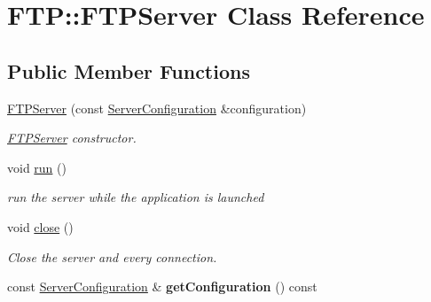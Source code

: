 \hypertarget{class_f_t_p_1_1_f_t_p_server}{\section{F\-T\-P\-:\-:F\-T\-P\-Server Class Reference}
\label{class_f_t_p_1_1_f_t_p_server}
}
\subsection*{Public Member Functions}
\begin{DoxyCompactItemize}
\item 
\hyperlink{class_f_t_p_1_1_f_t_p_server_a8ea3b0bab4f4991de8060c7741ef84b2}{F\-T\-P\-Server} (const \hyperlink{class_f_t_p_1_1_server_configuration}{Server\-Configuration} \&configuration)
\begin{DoxyCompactList}\small\item\em \hyperlink{class_f_t_p_1_1_f_t_p_server}{F\-T\-P\-Server} constructor. \end{DoxyCompactList}\item 
void \hyperlink{class_f_t_p_1_1_f_t_p_server_ac484c041ac5c602c6a0e5eb77b4c2828}{run} ()
\begin{DoxyCompactList}\small\item\em run the server while the application is launched \end{DoxyCompactList}\item 
\hypertarget{class_f_t_p_1_1_f_t_p_server_a3606447f498e487d2ab498dfddb62422}{void \hyperlink{class_f_t_p_1_1_f_t_p_server_a3606447f498e487d2ab498dfddb62422}{close} ()}\label{class_f_t_p_1_1_f_t_p_server_a3606447f498e487d2ab498dfddb62422}

\begin{DoxyCompactList}\small\item\em Close the server and every connection. \end{DoxyCompactList}\item 
\hypertarget{class_f_t_p_1_1_f_t_p_server_a505cd213609eccfa11d806562010d13f}{const \hyperlink{class_f_t_p_1_1_server_configuration}{Server\-Configuration} \& {\bfseries get\-Configuration} () const }\label{class_f_t_p_1_1_f_t_p_server_a505cd213609eccfa11d806562010d13f}

\end{DoxyCompactItemize}


